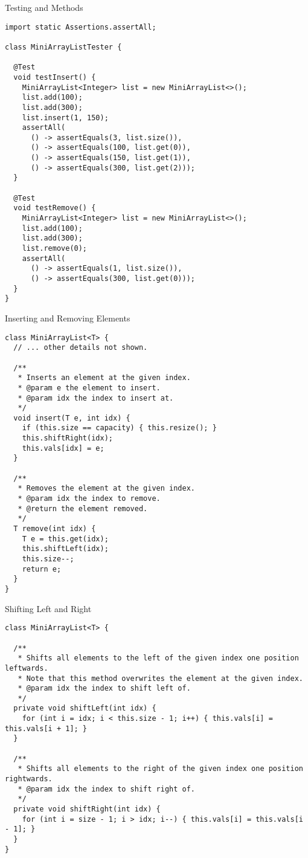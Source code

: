 \begin{cl}[]{Testing   and  Methods}
\begin{lstlisting}[language=MyJava]
import static Assertions.assertAll;

class MiniArrayListTester {

  @Test
  void testInsert() {
    MiniArrayList<Integer> list = new MiniArrayList<>();
    list.add(100);
    list.add(300);
    list.insert(1, 150);
    assertAll(
      () -> assertEquals(3, list.size()),
      () -> assertEquals(100, list.get(0)),
      () -> assertEquals(150, list.get(1)),
      () -> assertEquals(300, list.get(2)));
  }

  @Test
  void testRemove() {
    MiniArrayList<Integer> list = new MiniArrayList<>();
    list.add(100);
    list.add(300);
    list.remove(0);
    assertAll(
      () -> assertEquals(1, list.size()),
      () -> assertEquals(300, list.get(0)));
  }
}
\end{lstlisting}
\end{cl}

\begin{cl}[]{ Inserting and Removing Elements}
\begin{lstlisting}[language=MyJava]
class MiniArrayList<T> {
  // ... other details not shown.

  /**
   * Inserts an element at the given index.
   * @param e the element to insert.
   * @param idx the index to insert at.
   */
  void insert(T e, int idx) {
    if (this.size == capacity) { this.resize(); }
    this.shiftRight(idx);
    this.vals[idx] = e;
  }

  /**
   * Removes the element at the given index.
   * @param idx the index to remove.
   * @return the element removed.
   */
  T remove(int idx) {
    T e = this.get(idx);
    this.shiftLeft(idx);
    this.size--;
    return e;
  }
}
\end{lstlisting}
\end{cl}

\begin{cl}[]{Shifting Left and Right}
\begin{lstlisting}[language=MyJava]
class MiniArrayList<T> {

  /**
   * Shifts all elements to the left of the given index one position leftwards.
   * Note that this method overwrites the element at the given index.
   * @param idx the index to shift left of.
   */
  private void shiftLeft(int idx) {
    for (int i = idx; i < this.size - 1; i++) { this.vals[i] = this.vals[i + 1]; }
  }

  /**
   * Shifts all elements to the right of the given index one position rightwards.
   * @param idx the index to shift right of.
   */
  private void shiftRight(int idx) {
    for (int i = size - 1; i > idx; i--) { this.vals[i] = this.vals[i - 1]; }
  }
}
\end{lstlisting}
\end{cl}

